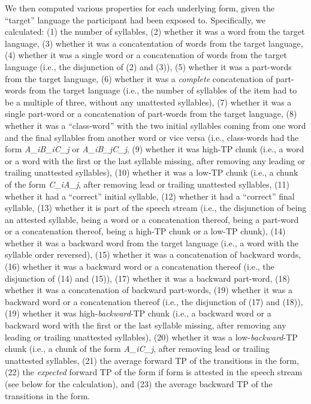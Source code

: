\documentclass[]{article}
\begin{document}
We then computed various properties for each underlying form, given the
``target'' language the participant had been exposed to. Specifically,
we calculated: (1) the number of syllables, (2) whether it was a word
from the target language, (3) whether it was a concatentation of words
from the target language, (4) whether it was a single word or a
concatenation of words from the target language (i.e., the disjunction
of (2) and (3)), (5) whether it was a part-words from the target
language, (6) whether it was a \emph{complete} concatenation of
part-words from the target language (i.e., the number of syllables of
the item had to be a multiple of three, without any unattested
syllables), (7) whether it was a single part-word or a concatenation of
part-words from the target language, (8) whether it was a ``class-word''
with the two initial syllables coming from one word and the final
syllables from another word or vice versa (i.e., class-words had the
form \emph{A\_iB\_iC\_j} or \emph{A\_iB\_jC\_j}, (9) whether it was
high-TP chunk (i.e., a word or a word with the first or the last
syllable missing, after removing any leading or trailing unattested
syllables), (10) whether it was a low-TP chunk (i.e., a chunk of the
form \emph{C\_iA\_j}, after removing lead or trailing unattested
syllables, (11) whether it had a ``correct'' initial syllable, (12)
whether it had a ``correct'' final syllable, (13) whether it is part of
the speech stream (i.e., the disjunction of being an attested syllable,
being a word or a concatenation thereof, being a part-word or a
concatenation thereof, being a high-TP chunk or a low-TP chunk), (14)
whether it was a backward word from the target language (i.e., a word
with the syllable order reversed), (15) whether it was a concatenation
of backward words, (16) whether it was a backward word or a
concatenation thereof (i.e., the disjunction of (14) and (15)), (17)
whether it was a backward part-word, (18) whether it was a concatenation
of backward part-words, (19) whether it was a backward word or a
concatenation thereof (i.e., the disjunction of (17) and (18)), (19)
whether it was high-\emph{backward}-TP chunk (i.e., a backward word or a
backward word with the first or the last syllable missing, after
removing any leading or trailing unattested syllables), (20) whether it
was a low-\emph{backward}-TP chunk (i.e., a chunk of the form
\emph{A\_iC\_j}, after removing lead or trailing unattested syllables,
(21) the average forward TP of the transitions in the form, (22) the
\emph{expected} forward TP of the form if form is attested in the speech
stream (see below for the calculation), and (23) the average backward TP
of the transitions in the form.
\end{document}
